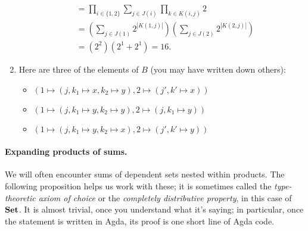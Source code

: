 \documentclass[Book-Poly]{subfiles}
\begin{document}
\begin{exercise}
\begin{solution}
\begin{enumerate}
\begin{align*}
	    &= \prod_{i\in \{1,2\}}\sum_{j\in J(i)}\prod_{k\in K(i,j)}2 \\
	    &= \left(\sum_{j\in J(1)} 2^{|K(1,j)|}\right)\left(\sum_{j\in J(2)} 2^{|K(2,j)|}\right) \\
	    &= \left(2^2\right)\left(2^1 + 2^1\right) = 16.
	\end{align*}
	\item Here are three of the elements of $B$ (you may have written down others):
	\begin{itemize}
	    \item $(1 \mapsto (j, k_1 \mapsto x, k_2 \mapsto y), 2 \mapsto (j', k' \mapsto x))$
	    \item $(1 \mapsto (j, k_1 \mapsto y, k_2 \mapsto y), 2 \mapsto (j, k_1 \mapsto y))$
	    \item $(1 \mapsto (j, k_1 \mapsto y, k_2 \mapsto x), 2 \mapsto (j', k' \mapsto y))$
	\end{itemize}
\qedhere
\end{enumerate}
\end{solution}
\end{exercise}

\paragraph{Expanding products of sums.}

We will often encounter sums of dependent sets nested within products.
The following proposition helps us work with these; it is sometimes called the \emph{type-theoretic axiom of choice} or the \emph{completely distributive property}, in this case of $\textbf{Set}$. It is almost trivial, once you understand what it's saying; in particular, once the statement is written in Agda, its proof is one short line of Agda code. 
\end{document}
